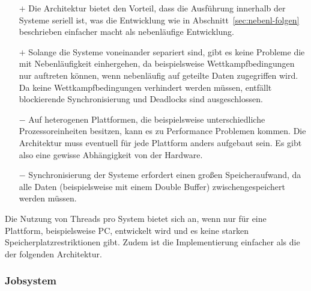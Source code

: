 \begin{itemize}
	\item[$+$] Die Architektur bietet den Vorteil, dass die Ausführung innerhalb der Systeme seriell ist, was die Entwicklung wie in Abschnitt~\ref{sec:nebenl-folgen} beschrieben einfacher macht als nebenläufige Entwicklung.
	\item[$+$] Solange die Systeme voneinander separiert sind, gibt es keine Probleme die mit Nebenläufigkeit einhergehen, da beispielsweise Wettkampfbedingungen nur auftreten können, wenn nebenläufig auf geteilte Daten zugegriffen wird. Da keine Wettkampfbedingungen verhindert werden müssen, entfällt blockierende Synchronisierung und Deadlocks sind ausgeschlossen.
	\item[$-$] Auf heterogenen Plattformen, die beispielsweise unterschiedliche Prozessoreinheiten besitzen, kann es zu Performance Problemen kommen. Die Architektur muss eventuell für jede Plattform anders aufgebaut sein. Es gibt also eine gewisse Abhängigkeit von der Hardware.
	\item[$-$] Synchronisierung der Systeme erfordert einen großen Speicheraufwand, da alle Daten (beispielsweise mit einem Double Buffer) zwischengespeichert werden müssen.
\end{itemize}

Die Nutzung von Threads pro System bietet sich an, wenn nur für eine Plattform, beispielsweise PC, entwickelt wird und es keine starken Speicherplatzrestriktionen gibt. Zudem ist die Implementierung einfacher als die der folgenden Architektur.

\subsubsection{Jobsystem}\label{sec:gamesJobsystem}


